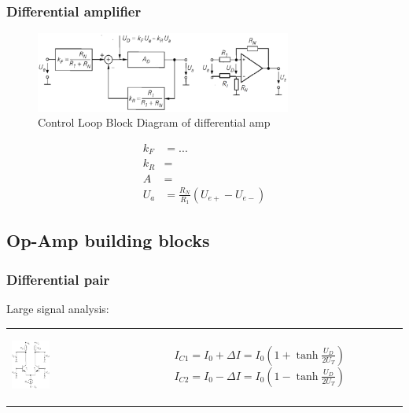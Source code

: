 	\newpage
	\subsubsection{Differential amplifier}
			\begin{figure}[h]
				\centering
				\includegraphics[width=0.75\textwidth]{images/ControlLoopDiffDiagram.png}
				\caption{Control Loop Block Diagram of differential amp}
				\label{Fig:ControlLoopDiffDiagram}
			\end{figure}
		    \begin{align}
		    	k_F &= ...\\
		    	k_R &= \\
		    	A &=  \\
		    	U_a &= \frac{R_N}{R_1}\left(U_{e+}-U_{e-}\right)
		    \end{align}
	
	\subsection{Op-Amp building blocks}
		\subsubsection{Differential pair}
			Large signal analysis: \\
			\begin{table}[h!]
				\centering
				\begin{tabular}{m{} m{} }
					
					\begin{center}\includegraphics[width=0.25\textwidth]{images/Differenzverstaerker.png}\end{center} 
				&
							
					$I_{C1} = I_0 + \Delta I = I_0 \left( 1 + \tanh\frac{U_D}{2 U_T} \right)$\newline
					$I_{C2} = I_0 - \Delta I = I_0 \left( 1 - \tanh\frac{U_D}{2 U_T} \right)$

				\\
			
				\end{tabular}
			\end{table}			
		
